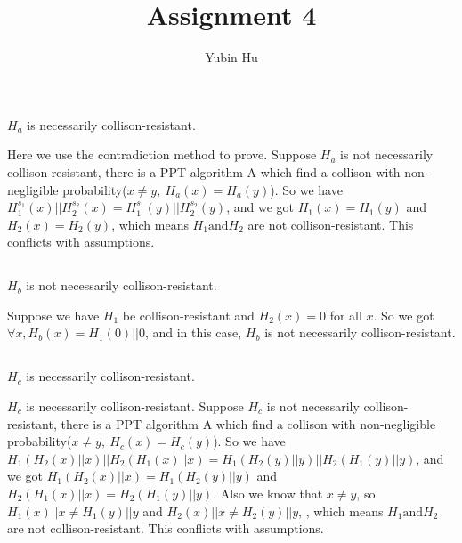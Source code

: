 \documentclass[onecolumn,oneside]{SUSTechHomework}
\author{Yubin Hu}
\title{Assignment 4}
\begin{document}
  \maketitle

  \section{}
  
    \subsection{}
    
    $H_a$ is necessarily collison-resistant.

    Here we use the contradiction method to prove.
    Suppose $H_a$ is not necessarily collison-resistant, there is a PPT algorithm A which find a collison with non-negligible probability($x \neq y,~H_a(x) = H_a(y)$).
    So we have $H_1^{s_1}(x)||H_2^{s_2}(x)=H_1^{s_1}(y)||H_2^{s_2}(y)$, and we got $H_1(x) = H_1(y)$ and $H_2(x) = H_2(y)$, which means $H_1 \mbox{and} H_2$ are not collison-resistant.
    This conflicts with assumptions. 

    \subsection{}

    $H_b$ is not necessarily collison-resistant.

    Suppose we have $H_1$ be collison-resistant and $H_2(x) = 0$ for all $x$.
    So we got $\forall x, H_b(x) = H_1(0)||0$, and in this case, $H_b$ is not necessarily collison-resistant.

    \subsection{}

    $H_c$ is necessarily collison-resistant. 

    $H_c$ is necessarily collison-resistant.
    Suppose $H_c$ is not necessarily collison-resistant, there is a PPT algorithm A which find a collison with non-negligible probability($x \neq y,~H_c(x) = H_c(y)$).
    So we have $H_1(H_2(x)||x)||H_2(H_1(x)||x) = H_1(H_2(y)||y)||H_2(H_1(y)||y)$, and we got $H_1(H_2(x)||x) = H_1(H_2(y)||y)$ and $H_2(H_1(x)||x) = H_2(H_1(y)||y)$.
    Also we know that $x \neq y$, so $H_1(x)||x \neq H_1(y)||y$ and $H_2(x)||x \neq H_2(y)||y$, , which means $H_1 \mbox{and} H_2$ are not collison-resistant.
    This conflicts with assumptions. 
\end{document}
